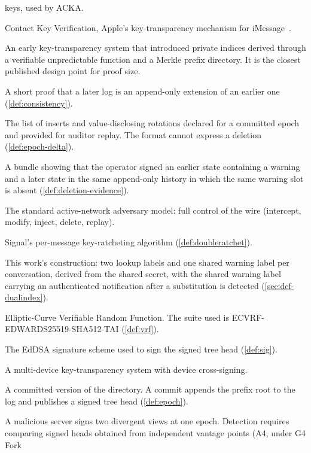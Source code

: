 \begin{description}
  keys, used by ACKA.
\item[CKV] Contact Key Verification, Apple's key-transparency mechanism for
  iMessage~\cite{apple-ckv}.
\item[CONIKS] An early key-transparency system that introduced private indices derived through a
  verifiable unpredictable function and a Merkle prefix directory. It is the closest published design point for proof size.
\item[Consistency proof] A short proof that a later log is an append-only extension of an earlier one
  (\cref{def:consistency}).
\item[Declared update set (epoch delta)] The list of inserts and value-disclosing rotations declared
  for a committed epoch and provided for auditor replay. The format cannot express a deletion
  (\cref{def:epoch-delta}).
\item[Deletion evidence] A bundle showing that the operator signed an earlier state containing a
  warning and a later state in the same append-only history in which the same warning slot is absent
  (\cref{def:deletion-evidence}).
\item[Dolev--Yao] The standard active-network adversary model: full control of the wire (intercept,
  modify, inject, delete, replay).
\item[Double Ratchet] Signal's per-message key-ratcheting algorithm (\cref{def:doubleratchet}).
\item[Dual-index warning scheme] This work's construction: two lookup labels and one shared warning
  label per conversation, derived from the shared secret, with the shared warning label carrying an
  authenticated notification after a substitution is detected (\cref{sec:def-dualindex}).
\item[ECVRF] Elliptic-Curve Verifiable Random Function. The suite used is
  ECVRF-EDWARDS25519-SHA512-TAI (\cref{def:vrf}).
\item[Ed25519] The EdDSA signature scheme used to sign the signed tree head (\cref{def:sig}).
\item[ELEKTRA] A multi-device key-transparency system with device cross-signing.
\item[Epoch] A committed version of the directory. A commit appends the prefix root to the log and
  publishes a signed tree head (\cref{def:epoch}).
\item[Equivocation / fork] A malicious server signs two divergent views at one epoch. Detection
  requires comparing signed heads obtained from independent vantage points (A4, under G4 Fork

\end{description}
